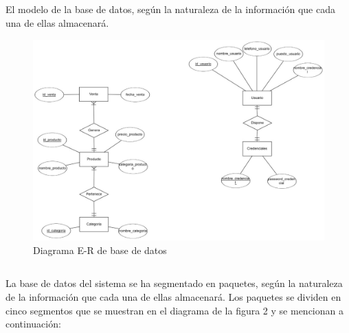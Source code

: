 \documentclass[10pt,a4paper]{article}
\begin{document}
\subsection{
	\textit{
		\color{colorESCOM}{Modelo E-R}
	}
}
El modelo de la base de datos, según la naturaleza de la información que cada una de ellas almacenará.

\begin{figure}[H]
	\includegraphics[scale=.35]{modeloER}
	\centering
	\caption{Diagrama E-R de base de datos}
	\label{img:modeloER}
\end{figure} 

\pagebreak

\subsection{
	\textit{
		\color{colorESCOM}{Modelo Relacional}
	}
}

La base de datos del sistema se ha segmentado en paquetes, según la naturaleza de la información
que cada una de ellas almacenará. Los paquetes se dividen en cinco segmentos que se muestran en el
diagrama de la figura 2 y se mencionan a continuación:
	
\end{document}
